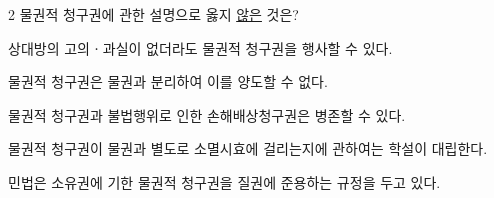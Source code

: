 \begin{question}{2}
물권적 청구권에 관한 설명으로 옳지 \uline{않은} 것은?
\begin{choices}
  \item 상대방의 고의ㆍ과실이 없더라도 물권적 청구권을 행사할 수 있다.
  \item 물권적 청구권은 물권과 분리하여 이를 양도할 수 없다.
  \item 물권적 청구권과 불법행위로 인한 손해배상청구권은 병존할 수 있다.
  \item 물권적 청구권이 물권과 별도로 소멸시효에 걸리는지에 관하여는 학설이 대립한다.
  \item 민법은 소유권에 기한 물권적 청구권을 질권에 준용하는 규정을 두고 있다.
\end{choices}
\end{question}
